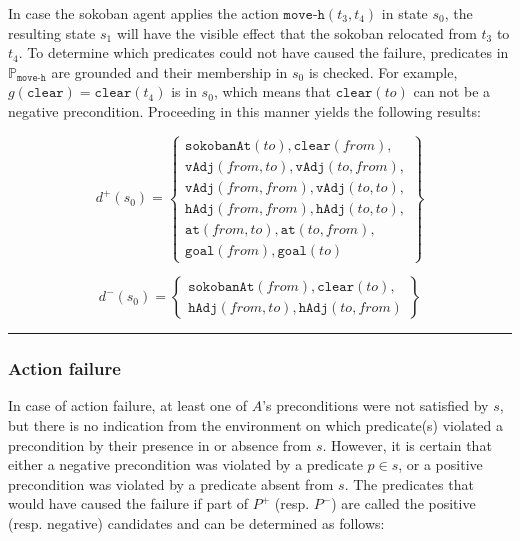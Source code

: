 \documentclass[../../Master.tex]{subfiles}
\begin{document}
\begin{example} \label{ex:moveSucceeded}
    In case the sokoban agent applies the action $\texttt{move-h}(t_3, t_4)$ in state $s_0$, the resulting state $s_1$ will have the visible effect that the sokoban relocated from $t_3$ to $t_4$. To determine which predicates could not have caused the failure, predicates in $\mathbb{P}_{\texttt{move-h}}$ are grounded and their membership in $s_0$ is checked. For example, $g \left( \texttt{clear} \right) = \texttt{clear}\left( t_4 \right)$ is in $s_0$, which means that $\texttt{clear}(to)$ can not be a negative precondition. Proceeding in this manner yields the following results:

    \begin{equation*}
        d^+(s_0) = \left\{
            \begin{gathered}
                \texttt{sokobanAt}(to), \texttt{clear}(from), \\
                \texttt{vAdj}(from, to), \texttt{vAdj}(to, from), \\
                \texttt{vAdj}(from, from), \texttt{vAdj}(to, to), \\
                \texttt{hAdj}(from, from), \texttt{hAdj}(to, to), \\
                \texttt{at}(from, to), \texttt{at}(to, from), \\
                \texttt{goal}(from), \texttt{goal}(to)
            \end{gathered}
        \right\}
    \end{equation*}

    \begin{equation*}
        d^-(s_0) = \left\{
            \begin{gathered}
                \texttt{sokobanAt}(from), \texttt{clear}(to), \\
                \texttt{hAdj}(from, to), \texttt{hAdj}(to, from)
            \end{gathered}
        \right\}
    \end{equation*}

    \noindent\rule{\textwidth}{1pt}
\end{example}

\subsubsection*{Action failure}
In case of action failure, at least one of $A$'s preconditions were not satisfied by $s$, but there is no indication from the environment on which predicate(s) violated a precondition by their presence in or absence from $s$. However, it is certain that either a negative precondition was violated by a predicate $p \in s$, or a positive precondition was violated by a predicate absent from $s$. The predicates that would have caused the failure if part of $P^+$ (resp. $P^-$) are called the positive (resp. negative) candidates and can be determined as follows:
\end{document}
